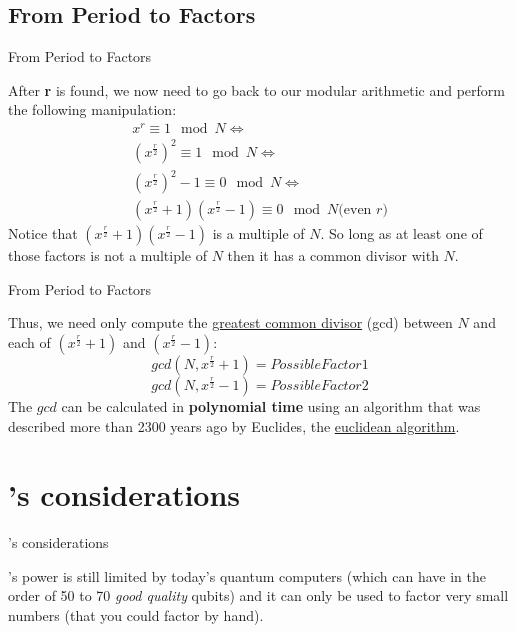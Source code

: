 \documentclass[aspectratio=43]{beamer}
\begin{document}
\newcommand{\xrsq}{x^{\frac{r}{2}}}
\newcommand{\pxrsq}{(\xrsq + 1)(\xrsq - 1)}
\subsection{From Period to Factors}
\begin{frame}{From Period to Factors}
    \begin{card}
        After \textbf{r} is found, we now need to go back to our modular arithmetic and perform the following manipulation:
        \begin{equation*}\begin{split}
            x^r \equiv 1 \mod N \Leftrightarrow \\ 
            (\xrsq)^2 \equiv 1 \mod N \Leftrightarrow \\
            (\xrsq)^2 - 1 \equiv 0 \mod N  \Leftrightarrow \\
            \pxrsq \equiv 0 \mod N \text{(even $r$)}
        \end{split}\end{equation*}
        Notice that $\pxrsq$ is a multiple of $N$. So long as at least one of those factors is not a multiple of $N$ then it has a common divisor with $N$.
    \end{card}
\pagenumber
\end{frame}

\begin{frame}{From Period to Factors}
    \begin{card}
        Thus, we need only compute the \href{https://en.wikipedia.org/wiki/Greatest_common_divisor}{greatest common divisor} (gcd) between $N$ and each of $(\xrsq + 1)$ and $(\xrsq - 1)$:
        \begin{equation*}
            gcd(N, \xrsq + 1) = PossibleFactor1
        \end{equation*}
        \begin{equation*}
            gcd(N, \xrsq - 1) = PossibleFactor2
        \end{equation*}
        The $gcd$ can be calculated in \textbf{polynomial time} using an algorithm that was described more than 2300 years ago by Euclides, the \href{https://en.wikipedia.org/wiki/Euclidean_algorithm}{euclidean algorithm}. 
    \end{card}
\pagenumber
\end{frame}

\section{\sa's considerations}
\begin{frame}{\sa's considerations}
    \begin{card}
        \sa's power is still limited by today's quantum computers (which can have in the order of 50 to 70 \textit{good quality} qubits) and it can only be used to factor very small numbers (that you could factor by hand).
    \end{card}
\pagenumber
\end{frame}
\end{document}
